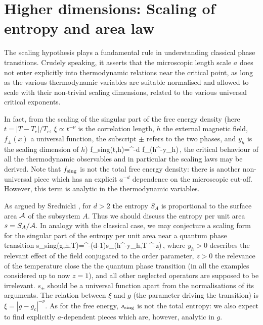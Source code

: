 \documentclass[12pt,aps,nofootinbib]{revtex4-1}
\begin{document}
\section{Higher dimensions: Scaling of entropy and area law}
\label{secthd}

The scaling hypothesis plays a fundamental rule in understanding
classical phase transitions. Crudely speaking, it asserts that the
microscopic length scale $a$ does not enter explicitly into thermodynamic
relations near the critical point, as long as the various thermodynamic
variables are suitable normalised and
allowed to scale with their non-trivial scaling dimensions, related to
the various universal critical exponents.

In fact, from the scaling of the singular part of the free energy density
(here $t=|T-T_c|/T_c$, $\xi\propto t^{-\nu}$ is the correlation length,
$h$ the external magnetic field, $f_{\pm}(x)$ a universal function,
the subscript $\pm$ refers to the two phases, and $y_h$ is the scaling
dimension of $h$)
\be
f_{\rm sing}(t,h)=\xi^{-d} f_{\pm}(h\xi^{-y_h})\,,
\ee
the critical behaviour of all the thermodynamic observables and in particular
the scaling laws may be derived. Note that $f_{\rm sing}$ is not the
total free energy density: there is another non-universal piece which
has an explicit $a^{-d}$ dependence on the microscopic cut-off. However,
this term is analytic in the thermodynamic variables.

As argued by Srednicki \cite{s-93}, for $d>2$ the entropy $S_A$ is
proportional to the surface area $\cal A$ of the subsystem $A$. Thus we
should discuss the entropy per unit area $s=S_A/{\cal A}$.
In analogy with the classical case, we may conjecture a scaling
form for the singular part of the
entropy per unit area near a quantum phase transition
\be
s_{\rm sing}(g,h,T)=\xi^{-(d-1)}s_\pm(h\xi^{-y_h},T \xi^{-z})\,,
\label{Sscal}
\ee
where $y_h>0$ describes the relevant effect of the field conjugated to the
order parameter, $z>0$ the
relevance of the temperature close the the quantum phase transition (in all
the examples considered up to now $z=1$), and all
other neglected operators are supposed to be irrelevant.
$s_\pm$ should be a universal function apart from
the normalisations of its arguments.
The relation between $\xi$ and $g$ (the parameter driving the transition)
is $\xi=|g-g_c|^{-\nu}$.
As for the free energy, $s_{\rm sing}$ is not the total entropy: we also
expect to find explicitly $a$-dependent pieces which are, however,
analytic in $g$.
\end{document}
